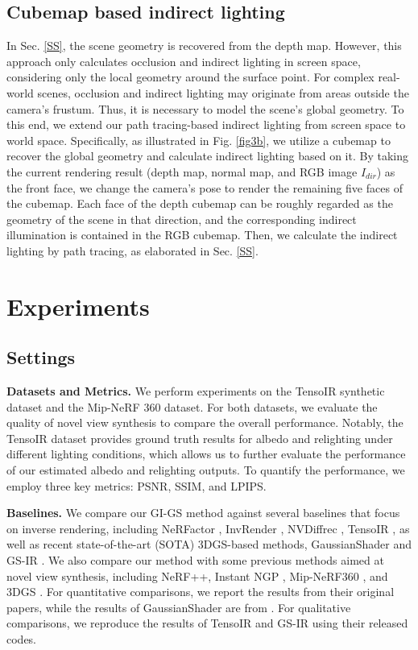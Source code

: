 \documentclass{article} %
\begin{document}
\subsection{Cubemap based indirect lighting}\label{ws}
In Sec. \ref{SS}, the scene geometry is recovered from the depth map. However, this approach only calculates occlusion and indirect lighting in screen space, considering only the local geometry around the surface point. For complex real-world scenes, occlusion and indirect lighting may originate from areas outside the camera's frustum. Thus, it is necessary to model the scene's global geometry. To this end, we extend our path tracing-based indirect lighting from screen space to world space. Specifically, as illustrated in Fig. \ref{fig3b}, we utilize a cubemap to recover the global geometry and calculate indirect lighting based on it. By taking the current rendering result (depth map, normal map, and RGB image $I_{dir}$) as the front face, we change the camera's pose to render the remaining five faces of the cubemap. Each face of the depth cubemap can be roughly regarded as the geometry of the scene in that direction, and the corresponding indirect illumination is contained in the RGB cubemap. Then, we calculate the indirect lighting by path tracing, as elaborated in Sec. \ref{SS}.

\section{Experiments}
\subsection{Settings}
\textbf{Datasets and Metrics.} We perform experiments on the TensoIR synthetic dataset \citep{jin2023tensoir} and the Mip-NeRF 360 \citep{mildenhall2021nerf} dataset. For both datasets, we evaluate the quality of novel view synthesis to compare the overall performance. Notably, the TensoIR dataset provides ground truth results for albedo and relighting under different lighting conditions, which allows us to further evaluate the performance of our estimated albedo and relighting outputs. To quantify the performance, we employ three key metrics: PSNR, SSIM, and LPIPS.

\textbf{Baselines.} We compare our GI-GS method against several baselines that focus on inverse rendering, including NeRFactor \citep{zhang2021nerfactor}, InvRender \citep{invrender}, NVDiffrec \citep{DIFFREC}, TensoIR \citep{jin2023tensoir}, as well as recent state-of-the-art (SOTA) 3DGS-based methods, GaussianShader \citep{jiang2024gaussianshader} and GS-IR \citep{gsir}. We also compare our method with some previous methods aimed at novel view synthesis, including NeRF++\citep{zhang2020nerf++}, Instant NGP \citep{ingp}, Mip-NeRF360 \citep{barron2021mip}, and 3DGS \citep{3dgs}. For quantitative comparisons, we report the results from their original papers, while the results of GaussianShader are from \citep{gs-id}. For qualitative comparisons, we reproduce the results of TensoIR and GS-IR using their released codes.
\end{document}

